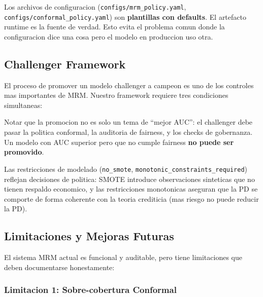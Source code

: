 \documentclass[
  spanish,
  11pt,
  letterpaper,
]{scrbook}
\theoremstyle{plain}
\theoremstyle{remark}
\begin{document}
\begin{tcolorbox}[enhanced jigsaw, arc=.35mm, bottomrule=.15mm, bottomtitle=1mm, breakable, colback=white, colbacktitle=quarto-callout-tip-color!10!white, colframe=quarto-callout-tip-color-frame, coltitle=black, left=2mm, leftrule=.75mm, opacityback=0, opacitybacktitle=0.6, rightrule=.15mm, title=\textcolor{quarto-callout-tip-color}{\faLightbulb}\hspace{0.5em}{Patron de inversion de dependencia}, titlerule=0mm, toprule=.15mm, toptitle=1mm]

Los archivos de configuracion (\texttt{configs/mrm\_policy.yaml},
\texttt{configs/conformal\_policy.yaml}) son \textbf{plantillas con
defaults}. El artefacto runtime es la fuente de verdad. Esto evita el
problema comun donde la configuracion dice una cosa pero el modelo en
produccion uso otra.

\end{tcolorbox}

\subsection{Challenger Framework}\label{sec-mrm-challenger}

El proceso de promover un modelo challenger a campeon es uno de los
controles mas importantes de MRM. Nuestro framework requiere tres
condiciones simultaneas:

Notar que la promocion no es solo un tema de ``mejor AUC'': el
challenger debe pasar la politica conformal, la auditoria de fairness, y
los checks de gobernanza. Un modelo con AUC superior pero que no cumple
fairness \textbf{no puede ser promovido}.

Las restricciones de modelado (\texttt{no\_smote},
\texttt{monotonic\_constraints\_required}) reflejan decisiones de
politica: SMOTE introduce observaciones sinteticas que no tienen
respaldo economico, y las restricciones monotonicas aseguran que la PD
se comporte de forma coherente con la teoria crediticia (mas riesgo no
puede reducir la PD).

\subsection{Limitaciones y Mejoras Futuras}\label{sec-mrm-limitations}

El sistema MRM actual es funcional y auditable, pero tiene limitaciones
que deben documentarse honestamente:

\subsubsection{Limitacion 1: Sobre-cobertura
Conformal}\label{limitacion-1-sobre-cobertura-conformal}
\end{document}
